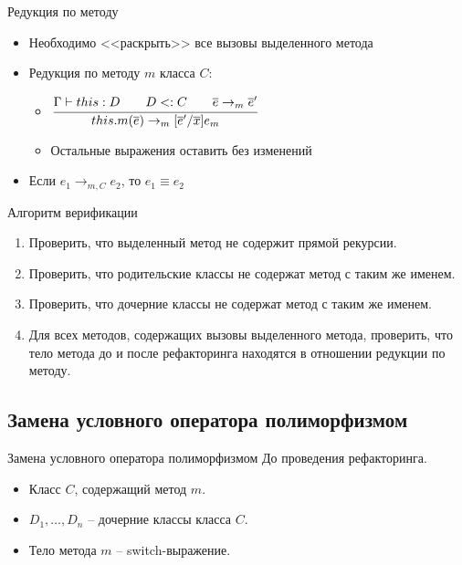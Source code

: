 \documentclass[hyperref=unicode,graphics=pdflatex,13pt]{beamer}
\begin{document}
\begin{frame}{Редукция по методу}
\begin{itemize}
    \item Необходимо <<раскрыть>> все вызовы выделенного метода
    \item Редукция по методу $m$ класса $C$:
    \begin{itemize}
        \item $\cfrac{\Gamma \vdash this : D \qquad D <: C \qquad \overline{e} \rightarrow_m \overline{e}'}{this.m(\overline{e}) \rightarrow_m [\overline{e}'/\overline{x}]e_m}$
        \item Остальные выражения оставить без изменений
    \end{itemize}
    \item Если $e_1 \rightarrow_{m,C} e_2$, то $e_1 \equiv e_2$
\end{itemize}
\end{frame}

\begin{frame}{Алгоритм верификации}
\begin{enumerate}
    \item Проверить, что выделенный метод не содержит прямой рекурсии.
    \item Проверить, что родительские классы не содержат метод с таким же именем.
    \item Проверить, что дочерние классы не содержат метод с таким же именем.
    \item Для всех методов, содержащих вызовы выделенного метода, проверить, что тело метода до и после рефакторинга находятся в отношении редукции по методу.
\end{enumerate}
\end{frame}

\subsection{Замена условного оператора полиморфизмом}
\begin{frame}{Замена условного оператора полиморфизмом}
До проведения рефакторинга.
\begin{itemize}
    \item Класс $C$, содержащий метод $m$.
    \item $D_1, \ldots, D_n$ -- дочерние классы класса $C$.
    \item Тело метода $m$ -- switch-выражение.
\end{itemize}
\end{frame}
\end{document}
